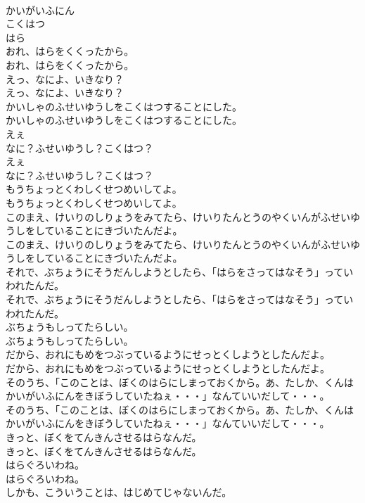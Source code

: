\documentclass[8pt]{extreport}
\begin{document}
\begin{CJK}{UTF8}{min}
\\	かいがいふにん
\\	こくはつ
\\	はら
\\	おれ、はらをくくったから。
\\	おれ、はらをくくったから。
\\	えっ、なによ、いきなり？
\\	えっ、なによ、いきなり？
\\	かいしゃのふせいゆうしをこくはつすることにした。
\\	かいしゃのふせいゆうしをこくはつすることにした。
\\	えぇ
\\	なに？ふせいゆうし？こくはつ？　
\\	えぇ
\\	なに？ふせいゆうし？こくはつ？　
\\	もうちょっとくわしくせつめいしてよ。
\\	もうちょっとくわしくせつめいしてよ。
\\	このまえ、けいりのしりょうをみてたら、けいりたんとうのやくいんがふせいゆうしをしていることにきづいたんだよ。
\\	このまえ、けいりのしりょうをみてたら、けいりたんとうのやくいんがふせいゆうしをしていることにきづいたんだよ。
\\	それで、ぶちょうにそうだんしようとしたら、「はらをさってはなそう」っていわれたんだ。
\\	それで、ぶちょうにそうだんしようとしたら、「はらをさってはなそう」っていわれたんだ。
\\	ぶちょうもしってたらしい。
\\	ぶちょうもしってたらしい。
\\	だから、おれにもめをつぶっているようにせっとくしようとしたんだよ。
\\	だから、おれにもめをつぶっているようにせっとくしようとしたんだよ。
\\	そのうち、「このことは、ぼくのはらにしまっておくから。あ、たしか、くんはかいがいふにんをきぼうしていたねぇ・・・」なんていいだして・・・。
\\	そのうち、「このことは、ぼくのはらにしまっておくから。あ、たしか、くんはかいがいふにんをきぼうしていたねぇ・・・」なんていいだして・・・。
\\	きっと、ぼくをてんきんさせるはらなんだ。
\\	きっと、ぼくをてんきんさせるはらなんだ。
\\	はらぐろいわね。
\\	はらぐろいわね。
\\	しかも、こういうことは、はじめてじゃないんだ。

\end{CJK}
\end{document}
